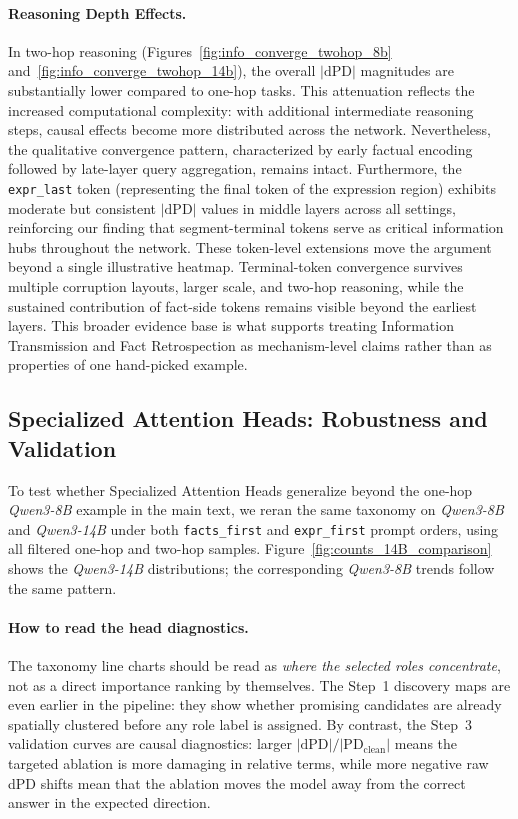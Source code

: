 \documentclass[11pt]{article}
\begin{document}
\paragraph{Reasoning Depth Effects.}
In two-hop reasoning (Figures~\ref{fig:info_converge_twohop_8b} and~\ref{fig:info_converge_twohop_14b}), the overall $|\mathrm{dPD}|$ magnitudes are substantially lower compared to one-hop tasks. This attenuation reflects the increased computational complexity: with additional intermediate reasoning steps, causal effects become more distributed across the network. Nevertheless, the qualitative convergence pattern, characterized by early factual encoding followed by late-layer query aggregation, remains intact. Furthermore, the \texttt{expr\_last} token (representing the final token of the expression region) exhibits moderate but consistent $|\mathrm{dPD}|$ values in middle layers across all settings, reinforcing our finding that segment-terminal tokens serve as critical information hubs throughout the network.
These token-level extensions move the argument beyond a single illustrative heatmap. Terminal-token convergence survives multiple corruption layouts, larger scale, and two-hop reasoning, while the sustained contribution of fact-side tokens remains visible beyond the earliest layers. This broader evidence base is what supports treating Information Transmission and Fact Retrospection as mechanism-level claims rather than as properties of one hand-picked example.

\subsection{Specialized Attention Heads: Robustness and Validation}
\label{appendix_heads}
To test whether Specialized Attention Heads generalize beyond the one-hop \textit{Qwen3-8B} example in the main text, we reran the same taxonomy on \textit{Qwen3-8B} and \textit{Qwen3-14B} under both \texttt{facts\_first} and \texttt{expr\_first} prompt orders, using all filtered one-hop and two-hop samples. Figure~\ref{fig:counts_14B_comparison} shows the \textit{Qwen3-14B} distributions; the corresponding \textit{Qwen3-8B} trends follow the same pattern.

\paragraph{How to read the head diagnostics.}
The taxonomy line charts should be read as \emph{where the selected roles concentrate}, not as a direct importance ranking by themselves. The Step~1 discovery maps are even earlier in the pipeline: they show whether promising candidates are already spatially clustered before any role label is assigned. By contrast, the Step~3 validation curves are causal diagnostics: larger $|\mathrm{dPD}|/|\mathrm{PD}_{\mathrm{clean}}|$ means the targeted ablation is more damaging in relative terms, while more negative raw dPD shifts mean that the ablation moves the model away from the correct answer in the expected direction.
\end{document}
